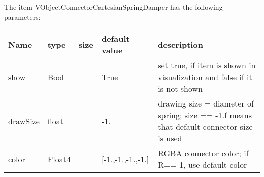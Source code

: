The item VObjectConnectorCartesianSpringDamper has the following parameters:\vspace{-1cm}\\ 
\begin{center}
  \footnotesize
  \begin{longtable}{| p{4.5cm} | p{2.5cm} | p{0.5cm} | p{2.5cm} | p{6cm} |}
    \hline
    \bf Name & \bf type & \bf size & \bf default value & \bf description \\ \hline
    show &     Bool &      &     True &     set true, if item is shown in visualization and false if it is not shown\\ \hline
    drawSize &     float &      &     -1. &     drawing size = diameter of spring; size == -1.f means that default connector size is used\\ \hline
    color &     Float4 &      &     [-1.,-1.,-1.,-1.] &     RGBA connector color; if R==-1, use default color\\ \hline
	  \end{longtable}
	\end{center}

